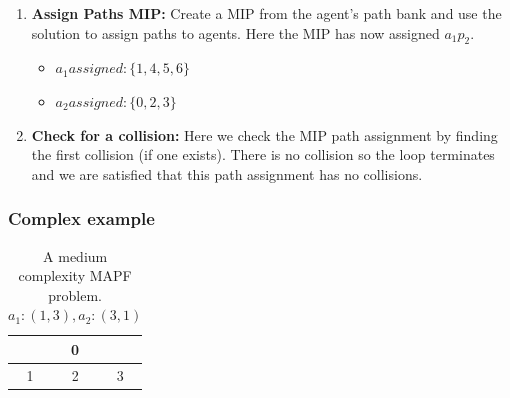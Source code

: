 \documentclass[a4paper,11pt]{article}
\begin{document}
\begin{enumerate}
	\item \textbf{Assign Paths MIP:} Create a MIP from the agent's path bank and use the solution to assign paths to agents. Here the MIP has now assigned $a_1p_2$.
	\begin{itemize}
		\item $a_1assigned: \{1, 4, 5, 6\}$
		\item $a_2assigned: \{0, 2, 3\}$
	\end{itemize}
	\item \textbf{Check for a collision:} Here we check the MIP path assignment by finding the first collision (if one exists). There is no collision so the loop terminates and we are satisfied that this path assignment has no collisions.
\end{enumerate}


\newpage
\subsubsection{Complex example}
\begin{table}[h]
	\centering
	\footnotesize
	\begin{tabular}{|c|c|c|}
		\hline
		\cellcolor{black} & 0 & \cellcolor{black} \\ \hline
		1 & 2 & 3 \\ \hline
	\end{tabular}
	
	\caption{A medium complexity MAPF problem. $a_1: (1, 3), a_2: (3, 1)$}
	\label{fig:complex-step-through-example}
\end{table}
\end{document}
